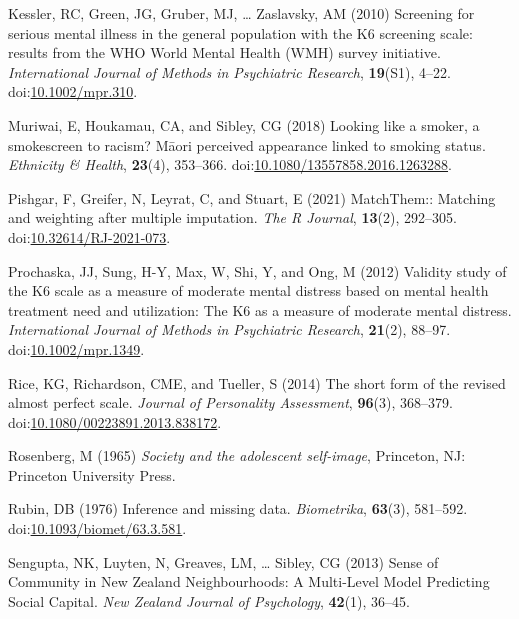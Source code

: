 \documentclass[
  singlecolumn,
  9pt]{article}
\newlength{\cslhangindent}
\newenvironment{CSLReferences}[2] %
 {\begin{list}{}{%
  \setlength{\itemindent}{0pt}
  \setlength{\leftmargin}{0pt}
  \setlength{\parsep}{0pt}
  \ifodd #1
   \setlength{\leftmargin}{\cslhangindent}
   \setlength{\itemindent}{-1\cslhangindent}
  \fi
  \setlength{\itemsep}{#2\baselineskip}}}
 {\end{list}}
\begin{document}
\begin{CSLReferences}{1}{0}
Kessler, RC, Green, JG, Gruber, MJ, \ldots{} Zaslavsky, AM (2010)
Screening for serious mental illness in the general population with the
K6 screening scale: results from the WHO World Mental Health (WMH)
survey initiative. \emph{International Journal of Methods in Psychiatric
Research}, \textbf{19}(S1), 4--22.
doi:\href{https://doi.org/10.1002/mpr.310}{10.1002/mpr.310}.

Muriwai, E, Houkamau, CA, and Sibley, CG (2018) Looking like a smoker, a
smokescreen to racism? Māori perceived appearance linked to smoking
status. \emph{Ethnicity \& Health}, \textbf{23}(4), 353--366.
doi:\href{https://doi.org/10.1080/13557858.2016.1263288}{10.1080/13557858.2016.1263288}.

Pishgar, F, Greifer, N, Leyrat, C, and Stuart, E (2021) MatchThem::
Matching and weighting after multiple imputation. \emph{The R Journal},
\textbf{13}(2), 292--305.
doi:\href{https://doi.org/10.32614/RJ-2021-073}{10.32614/RJ-2021-073}.

Prochaska, JJ, Sung, H-Y, Max, W, Shi, Y, and Ong, M (2012) Validity
study of the K6 scale as a measure of moderate mental distress based on
mental health treatment need and utilization: The K6 as a measure of
moderate mental distress. \emph{International Journal of Methods in
Psychiatric Research}, \textbf{21}(2), 88--97.
doi:\href{https://doi.org/10.1002/mpr.1349}{10.1002/mpr.1349}.

Rice, KG, Richardson, CME, and Tueller, S (2014) The short form of the
revised almost perfect scale. \emph{Journal of Personality Assessment},
\textbf{96}(3), 368--379.
doi:\href{https://doi.org/10.1080/00223891.2013.838172}{10.1080/00223891.2013.838172}.

Rosenberg, M (1965) \emph{Society and the adolescent self-image},
Princeton, NJ: Princeton University Press.

Rubin, DB (1976) Inference and missing data. \emph{Biometrika},
\textbf{63}(3), 581--592.
doi:\href{https://doi.org/10.1093/biomet/63.3.581}{10.1093/biomet/63.3.581}.

Sengupta, NK, Luyten, N, Greaves, LM, \ldots{} Sibley, CG (2013) Sense
of Community in New Zealand Neighbourhoods: A Multi-Level Model
Predicting Social Capital. \emph{New Zealand Journal of Psychology},
\textbf{42}(1), 36--45.


\end{CSLReferences}
\end{document}
